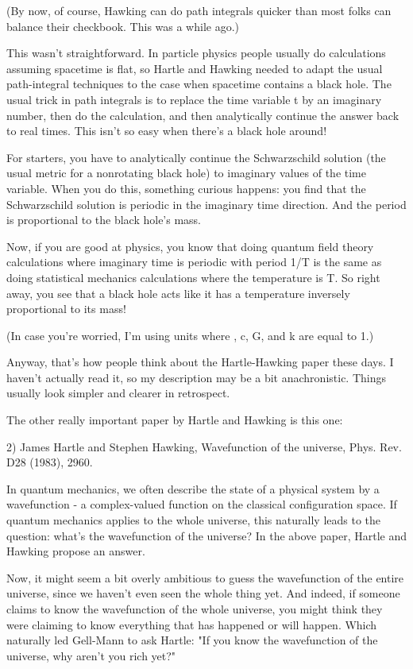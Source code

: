 (By now, of course, Hawking can do path integrals quicker than most
folks can balance their checkbook.  This was a while ago.)

This wasn't straightforward.  In particle physics people usually do 
calculations assuming spacetime is flat, so Hartle and Hawking needed 
to adapt the usual path-integral techniques to the case when spacetime 
contains a black hole.  The usual trick in path integrals is to replace 
the time variable t by an imaginary number, then do the calculation, and 
then analytically continue the answer back to real times.  This isn't so 
easy when there's a black hole around!  

For starters, you have to analytically continue the Schwarzschild solution 
(the usual metric for a nonrotating black hole) to imaginary values of the 
time variable.  When you do this, something curious happens: you find that 
the Schwarzschild solution is periodic in the imaginary time direction.
And the period is proportional to the black hole's mass.

Now, if you are good at physics, you know that doing quantum field
theory calculations where imaginary time is periodic with period 1/T
is the same as doing statistical mechanics calculations where the 
temperature is T.  So right away, you see that a black hole acts like
it has a temperature inversely proportional to its mass!  

(In case you're worried, I'm using units where \hbar , c, G, and k are
equal to 1.)

Anyway, that's how people think about the Hartle-Hawking paper these
days.  I haven't actually read it, so my description may be a bit
anachronistic.  Things usually look simpler and clearer in retrospect.

The other really important paper by Hartle and Hawking is this one:

2) James Hartle and Stephen Hawking, Wavefunction of the universe,
Phys. Rev. D28 (1983), 2960.

In quantum mechanics, we often describe the state of a physical
system by a wavefunction - a complex-valued function on the 
classical configuration space.  If quantum mechanics applies to
the whole universe, this naturally leads to the question: what's
the wavefunction of the universe?  In the above paper, Hartle
and Hawking propose an answer.

Now, it might seem a bit overly ambitious to guess the wavefunction
of the entire universe, since we haven't even seen the whole thing yet.  
And indeed, if someone claims to know the wavefunction of the whole 
universe, you might think they were claiming to know everything
that has happened or will happen.  Which naturally led Gell-Mann to 
ask Hartle: "If you know the wavefunction of the universe, why aren't
you rich yet?"

